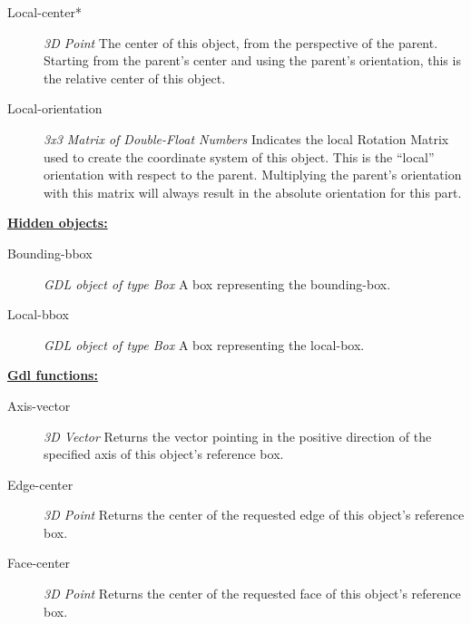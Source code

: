 \documentclass [11pt]{book}
\begin{document}
\begin{itemize}
\begin{description}
\item [Local-center*]
\emph{3D Point} The center of this object, from the perspective of the parent. Starting
from the parent's center and using the parent's orientation, this is the relative center
of this object.


\item [Local-orientation]
\emph{3x3 Matrix of Double-Float Numbers} Indicates the local Rotation Matrix used
to create the coordinate system of this object. This is the ``local''
orientation with respect to the parent. Multiplying the parent's orientation
with this matrix will always result in the absolute orientation for this part.


\end{description}






\textbf{
\underline{Hidden objects:}}

\begin{description}

\item [Bounding-bbox]
\emph{GDL object of type Box} A box representing the bounding-box.


\item [Local-bbox]
\emph{GDL object of type Box} A box representing the local-box.


\end{description}






\textbf{
\underline{Gdl functions:}}

\begin{description}

\item [Axis-vector]
\emph{3D Vector} Returns the vector pointing in the positive direction of the specified axis of this object's reference box.


\item [Edge-center]
\emph{3D Point} Returns the center of the requested edge of this object's reference box.


\item [Face-center]
\emph{3D Point} Returns the center of the requested face of this object's reference box.



\end{description}
\end{itemize}
\end{document}
